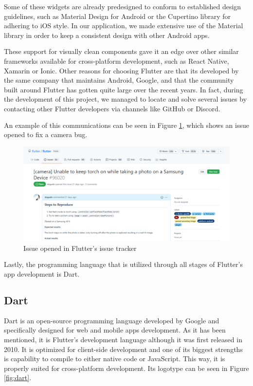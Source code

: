 Some of these widgets are already predesigned to conform to established design guidelines, such as Material Design \cite{noauthor_material_nodate} for Android or the Cupertino library for adhering to iOS style. In our application, we made extensive use of the Material library in order to keep a consistent design with other Android apps.

These support for visually clean components gave it an edge over other similar frameworks available for cross-platform development, such as React Native, Xamarin or Ionic. Other reasons for choosing Flutter are that its developed by the same company that maintains Android, Google, and that the community built around Flutter has gotten quite large over the recent years. In fact, during the development of this project, we managed to locate and solve several issues by contacting other Flutter developers via channels like GitHub or Discord.

An example of this communications can be seen in Figure \ref{fig:flutter-issue}, which shows an issue opened to fix a camera bug.

\begin{figure}[h]
  \centering
  \includegraphics[width=\textwidth]{Figures/flutter-issue.png}
  \caption{%
    Issue opened in Flutter's issue tracker
  }
  \label{fig:flutter-issue}
\end{figure}

Lastly, the programming language that is utilized through all stages of Flutter's app development is Dart.

\subsection{Dart}

Dart \cite{noauthor_dart_nodate-1} is an open-source programming language developed by Google and specifically designed for web and mobile apps development. As it has been mentioned, it is Flutter's development language although it was first released in 2010. It is optimized for client-side development and one of its biggest strengths is capability to compile to either native code or JavaScript. This way, it is properly suited for cross-platform development. Its logotype can be seen in Figure \ref{fig:dart}.

